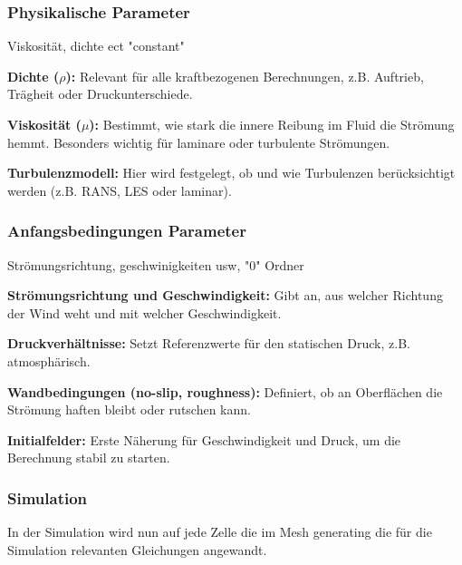 \subsubsection{Physikalische Parameter\label{openfoam:section:Physikalische Parameter}}
Viskosität, dichte ect "constant"
\begin{physpam}
    \item \textbf{Dichte ($\rho$):} Relevant für alle kraftbezogenen Berechnungen, z.B. Auftrieb, Trägheit oder Druckunterschiede.
    \item \textbf{Viskosität ($\mu$):} Bestimmt, wie stark die innere Reibung im Fluid die Strömung hemmt. Besonders wichtig für laminare oder turbulente Strömungen.
    \item \textbf{Turbulenzmodell:} Hier wird festgelegt, ob und wie Turbulenzen berücksichtigt werden (z.B. RANS, LES oder laminar).
\end{physpam}

\subsubsection{Anfangsbedingungen Parameter\label{openfoam:section:Anfangs und Randbedingungen}}
Strömungsrichtung, geschwinigkeiten usw, "0" Ordner
\begin{anfrandbed}
    \item \textbf{Strömungsrichtung und Geschwindigkeit:} Gibt an, aus welcher Richtung der Wind weht und mit welcher Geschwindigkeit.
    \item \textbf{Druckverhältnisse:} Setzt Referenzwerte für den statischen Druck, z.B. atmosphärisch.
    \item \textbf{Wandbedingungen (no-slip, roughness):} Definiert, ob an Oberflächen die Strömung haften bleibt oder rutschen kann.
    \item \textbf{Initialfelder:} Erste Näherung für Geschwindigkeit und Druck, um die Berechnung stabil zu starten.
\end{anfrandbed}



\subsubsection{Simulation\label{openfoam:section:Simulation}}
In der Simulation wird nun auf jede Zelle die im Mesh generating die für die Simulation relevanten Gleichungen angewandt. 

